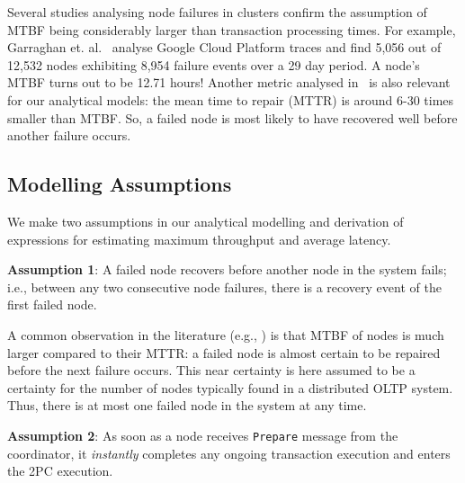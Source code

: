 Several studies \cite{garraghan,wang,birke} analysing node failures in clusters confirm the assumption of 
MTBF being considerably larger than transaction processing times. For example, Garraghan et. 
al.~\cite{garraghan} analyse Google Cloud Platform traces and find 5,056 out of 12,532 nodes exhibiting 8,954 
failure events over a 29 day period. A node's MTBF turns out to be 12.71 hours! Another metric analysed 
in~\cite{garraghan} is also relevant for our analytical models: the mean time to repair (MTTR) is around 6-30 
times smaller than MTBF. 
So, a failed node is most likely to have recovered well before another failure occurs.  


\subsection{Modelling Assumptions}
\label{sec:model-assumptions}

We make two assumptions in our analytical modelling and derivation of expressions for estimating maximum throughput and average latency.

\noindent \textbf{Assumption 1}: A failed node recovers before another node in the system fails; i.e., between any two consecutive node failures, there is a recovery event of the first failed node.

A common observation in the literature (e.g., \cite{garraghan,wang,birke}) is that MTBF of nodes is much larger compared to their MTTR: a failed node is almost certain to be repaired before the next failure occurs. This near certainty is here assumed to be a certainty for the number of nodes typically found in a distributed OLTP system. Thus, 
there is at most one failed node in the system at any time.

\noindent \textbf{Assumption 2}: As soon as a node receives \texttt{Prepare} message from the coordinator, it \textit{instantly} completes any ongoing transaction execution and enters the 2PC execution. 

